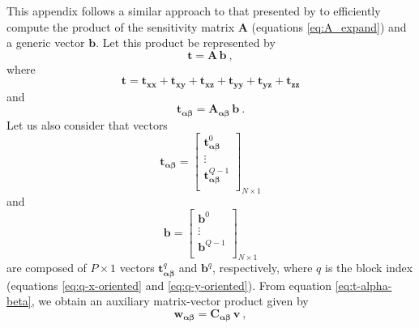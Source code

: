 \documentclass[manuscript]{geophysics}
\begin{document}
	This appendix follows a similar approach to that presented by \citet{takahashi2020convolutional}
	to efficiently compute the product of the sensitivity matrix
	$\mathbf{A}$ (equations \ref{eq:A_expand}) and a generic vector $\mathbf{b}$. 
	Let this product be represented by
	\begin{equation}
		\mathbf{t} = 
		\mathbf{A} \, \mathbf{b} \: ,
		\label{eq:t}
	\end{equation}
	where 
	\begin{equation}
		\mathbf{t} = \mathbf{t}_{\boldsymbol{xx}} + \mathbf{t}_{\boldsymbol{xy}} + \mathbf{t}_{\boldsymbol{xz}} +
		\mathbf{t}_{\boldsymbol{yy}} + \mathbf{t}_{\boldsymbol{yz}} + \mathbf{t}_{\boldsymbol{zz}}
		\label{eq:t-components}
	\end{equation}
	and
	\begin{equation}
		\mathbf{t}_{\boldsymbol{\alpha\beta}} = 
		\mathbf{A_{\boldsymbol{\alpha\beta}}} \, \mathbf{b} \: .
		\label{eq:t-alpha-beta}
	\end{equation}
	Let us also consider that vectors
	\begin{equation}
		\mathbf{t}_{\boldsymbol{\alpha\beta}} = \begin{bmatrix}
			\mathbf{t}^{0}_{\boldsymbol{\alpha\beta}} \\
			\vdots \\
			\mathbf{t}^{Q-1}_{\boldsymbol{\alpha\beta}} \\
		\end{bmatrix}_{N \times 1}
		\label{eq:t-alpha-beta-partitioned}
	\end{equation} 
	and
	\begin{equation}
		\mathbf{b} = \begin{bmatrix}
			\mathbf{b}^{0} \\
			\vdots \\
			\mathbf{b}^{Q-1} \\
		\end{bmatrix}_{N \times 1}
		\label{eq:b-partitioned}
	\end{equation}
	are composed of $P \times 1$ vectors $\mathbf{t}^{q}_{\boldsymbol{\alpha\beta}}$ and $\mathbf{b}^{q}$,
	respectively, where $q$ is the block index (equations \ref{eq:q-x-oriented} and \ref{eq:q-y-oriented}). 
	From equation \ref{eq:t-alpha-beta}, we obtain an auxiliary matrix-vector product given by
	\begin{equation}
		\mathbf{w}_{\boldsymbol{\alpha\beta}} = \mathbf{C}_{\boldsymbol{\alpha\beta}} \, \mathbf{v} \: ,
		\label{eq:w_alpha_beta}
	\end{equation}
\end{document}

